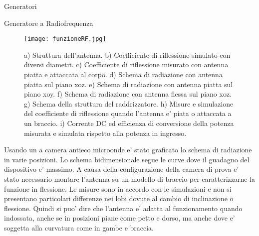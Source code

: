 \begin{section}{Generatori}
\begin{subsection}{Generatore a Radiofrequenza}
        \begin{figure}[hbt!]
            \texttt{[image: funzioneRF.jpg]}
            \centering
            \caption{a) Struttura dell'antenna. b) Coefficiente di riflessione simulato con diversi diametri. c) Coefficiente di riflessione misurato con antenna piatta e attaccata al corpo. d) Schema di radiazione con antenna piatta sul piano xoz. e) Schema di radiazione con antenna piatta sul piano xoy. f) Schema di radiazione con antenna flessa sul piano xoz. g) Schema della struttura del raddrizzatore. h) Misure e simulazione del coefficiente di riflessione quando l'antenna e' piata o attaccata a un braccio. i) Corrente DC ed efficienza di conversione della potenza misurata e simulata rispetto alla potenza in ingresso.\cite{kouWearableAllFabricHybrid2024}}
            \label{fig:funzioneRF}
        \end{figure}
        
        Usando un a camera antieco microonde e' stato graficato lo schema di radiazione in varie posizioni. Lo schema bidimensionale segue le curve dove il guadagno del dispositivo e' massimo. A causa della configurazione della camera di prova e' stato necessario montare l'antenna su un modello di braccio per caratterizzarne la funzione in flessione. Le misure sono in accordo con le simulazioni e non si presentano particolari differenze nei lobi dovute al cambio di inclinazione o flessione. Quindi si puo' dire che l'antenna e' adatta al funzionamento quando indossata, anche se in posizioni piane come petto e dorso, ma anche dove e' soggetta alla curvatura come in gambe e braccia.


\end{subsection}
\end{section}
